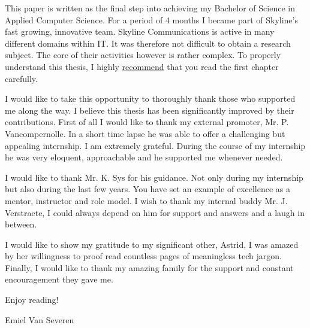 This paper is written as the final step into achieving my Bachelor of Science
in Applied Computer Science. For a period of 4 months I became part of Skyline's fast growing, innovative team.
Skyline Communications is active in many different domains within IT. It was therefore not difficult to obtain
a research subject. The core of their activities however is rather complex. To properly understand this thesis,
I highly \ul{recommend} that you read the first chapter carefully.


I would like to take this opportunity to thoroughly thank those who supported me along the way. I believe this thesis has been significantly improved by their contributions. First of all I would like to thank my external promoter, Mr. P. Vancompernolle. In a short time lapse he was able to offer a challenging but appealing internship. I am extremely grateful.
During the course of my internship he was very eloquent, approachable and he supported me whenever needed.

I would like to thank Mr. K. Sys for his guidance. Not only during my internship but also during the last few years.
You have set an example of excellence as a mentor, instructor and role model. I wish to thank my internal buddy Mr. J. Verstraete, I could always depend on him for support and answers and a laugh in between.

I would like to show my gratitude to my significant other, Astrid, I was amazed by her willingness to proof
read countless pages of meaningless tech jargon.
Finally, I would like to thank my amazing family for the support and constant encouragement they gave me.

Enjoy reading!

Emiel Van Severen

